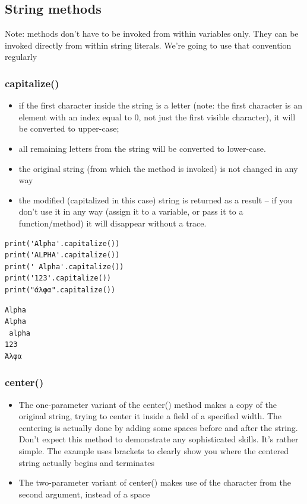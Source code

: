 \documentclass[11pt]{article}
\begin{document}
\newpage
\subsection{String methods}
\label{sec:org921c1f3}
Note: methods don’t have to be invoked from within variables
only. They can be invoked directly from within string literals. We’re
going to use that convention regularly

\subsubsection{capitalize()}
\label{sec:org70935f7}
\begin{itemize}
\item if the first character inside the string is a letter (note: the
first character is an element with an index equal to 0, not just the
first visible character), it will be converted to upper-case;
\item all remaining letters from the string will be converted to
lower-case.
\item the original string (from which the method is invoked) is not
changed in any way
\item the modified (capitalized in this case) string is returned as a
result – if you don’t use it in any way (assign it to a variable, or
pass it to a function/method) it will disappear without a trace.
\end{itemize}

\begin{verbatim}
print('Alpha'.capitalize())
print('ALPHA'.capitalize())
print(' Alpha'.capitalize())
print('123'.capitalize())
print("άλφα".capitalize())
\end{verbatim}

\begin{verbatim}
Alpha
Alpha
 alpha
123
Άλφα
\end{verbatim}

\subsubsection{center()}
\label{sec:org3dfa0f2}
\begin{itemize}
\item The one-parameter variant of the center() method makes a copy of the
original string, trying to center it inside a field of a specified
width. The centering is actually done by adding some spaces before
and after the string. Don’t expect this method to demonstrate any
sophisticated skills. It’s rather simple. The example uses brackets
to clearly show you where the centered string actually begins and
terminates
\item The two-parameter variant of center() makes use of the character
from the second argument, instead of a space
\end{itemize}
\end{document}
